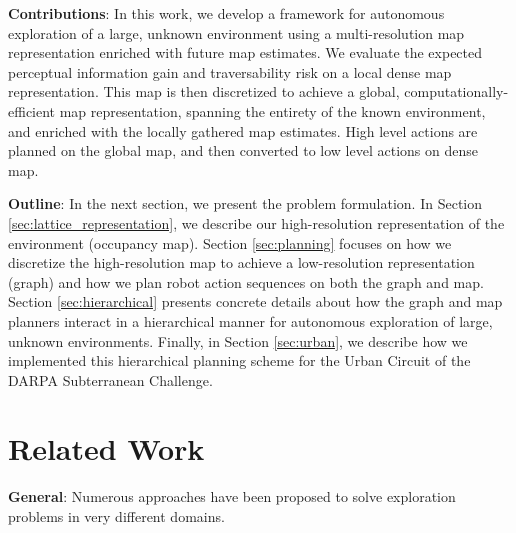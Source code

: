 \documentclass{article}
\newcommand{\ph}[1]{{\textbf{#1}:}} %
\begin{document}
\ph{Contributions}
In this work, we develop a framework for autonomous exploration of a large, unknown environment using a multi-resolution map representation enriched with future map estimates. We evaluate the expected perceptual information gain and traversability risk on a local dense map representation. This map is then discretized to achieve a global, computationally-efficient map representation, spanning the entirety of the known environment, and enriched with the locally gathered map estimates. High level actions are planned on the global map, and then converted to low level actions on dense map.    

\ph{Outline}
In the next section, we present the problem formulation. In Section \ref{sec:lattice_representation}, we describe our high-resolution representation of the environment (occupancy map). Section \ref{sec:planning} focuses on how we discretize the high-resolution map to achieve a low-resolution representation (graph) and how we plan robot action sequences on both the graph and map. Section \ref{sec:hierarchical} presents concrete details about how the graph and map planners interact in a hierarchical manner for autonomous exploration of large, unknown environments. Finally, in Section \ref{sec:urban}, we describe how we implemented this hierarchical planning scheme for the Urban Circuit of the DARPA Subterranean Challenge.


\section{Related Work}

\ph{General}
Numerous approaches have been proposed to solve exploration problems in very different domains.
\end{document}
